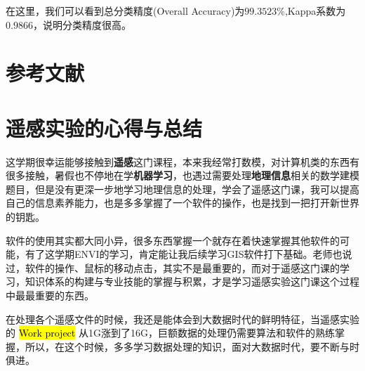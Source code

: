\documentclass[12pt,a4paper]{article}
\newcommand{\code}[1]{
	\begingroup
	\sethlcolor{Seashell}%
	\textcolor{Firebrick4}{\hl{#1}}%
	\endgroup
}
\begin{document}
在这里，我们可以看到总分类精度(Overall Accuracy)为$99.3523\%$,Kappa系数为$0.9866$，说明分类精度很高。



\section{参考文献}

	



\section{遥感实验的心得与总结}




这学期很幸运能够接触到\textbf{遥感}这门课程，本来我经常打数模，对计算机类的东西有很多接触，暑假也不停地在学\textbf{机器学习}，也遇过需要处理\textbf{地理信息}相关的数学建模题目，但是没有更深一步地学习地理信息的处理，学会了遥感这门课，我可以提高自己的信息素养能力，也是多多掌握了一个软件的操作，也是找到一把打开新世界的钥匙。

软件的使用其实都大同小异，很多东西掌握一个就存在着快速掌握其他软件的可能，有了这学期ENVI的学习，肯定能让我后续学习GIS软件打下基础。老师也说过，软件的操作、鼠标的移动点击，其实不是最重要的，而对于遥感这门课的学习，知识体系的构建与专业技能的掌握与积累，才是学习遥感实验这门课这个过程中最最重要的东西。

在处理各个遥感文件的时候，我还是能体会到大数据时代的鲜明特征，当遥感实验的\code{Work project}从1G涨到了16G，巨额数据的处理仍需要算法和软件的熟练掌握，所以，在这个时候，多多学习数据处理的知识，面对大数据时代，要不断与时俱进。
\end{document}

